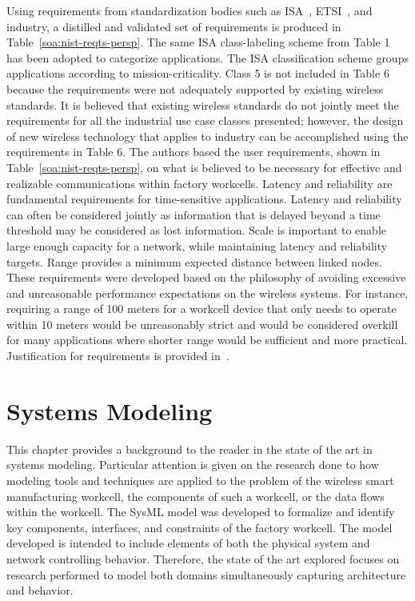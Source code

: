 Using requirements from standardization bodies such as ISA~\cite{ISATR100-2011}, ETSI~\cite{etsi103588}, and industry, a distilled and validated set of requirements is produced in Table~\ref{soa:nist-reqts-persp}. The same ISA class-labeling scheme from Table 1 has been adopted to categorize applications. The ISA classification scheme groups applications according to mission-criticality. Class 5 is not included in Table 6 because the requirements were not adequately supported by existing wireless standards. It is believed that existing wireless standards do not jointly meet the requirements for all the industrial use case classes presented; however, the design of new wireless technology that applies to industry can be accomplished using the requirements in Table 6. The authors based the user requirements, shown in Table~\ref{soa:nist-reqts-persp}, on what is believed to be necessary for effective and realizable communications within factory workcells. Latency and reliability are fundamental requirements for time-sensitive applications. Latency and reliability can often be considered jointly as information that is delayed beyond a time threshold may be considered as lost information. Scale is important to enable large enough capacity for a network, while maintaining latency and reliability targets. Range provides a minimum expected distance between linked nodes. These requirements were developed based on the philosophy of avoiding excessive and unreasonable performance expectations on the wireless systems. For instance, requiring a range of 100 meters for a workcell device that only needs to operate within 10 meters would be unreasonably strict and would be considered overkill for many applications where shorter range would be sufficient and more practical. Justification for requirements is provided in~\cite{Montgomery2019}.





\chapter{Systems Modeling}

\chapterintro*

This chapter provides a background to the reader in the state of the art in systems modeling.  Particular attention is given on the research done to how modeling tools and techniques are applied to the problem of the wireless smart manufacturing workcell, the components of such a workcell, or the data flows within the workcell.  The SysML model was developed to formalize and identify key components, interfaces, and constraints of the factory workcell.  The model developed is intended to include elements of both the physical system and network controlling behavior.  Therefore, the state of the art explored focuses on research performed to model both domains simultaneously capturing architecture and behavior.

